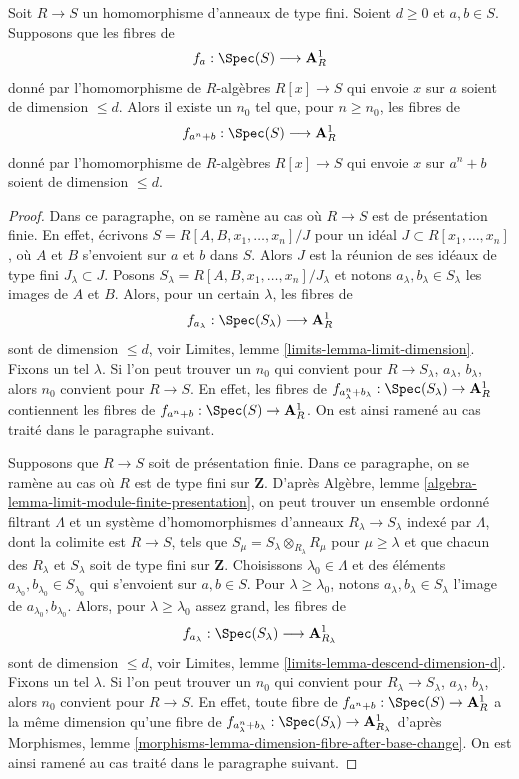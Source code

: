 \begin{lemma}
\label{lemma-sum-is-ok}
Soit $R \to S$ un homomorphisme d'anneaux de type fini. Soient $d \geq 0$ et $a, b \in S$.
Supposons que les fibres de
$$
f_a : \Spec(S) \longrightarrow \mathbf{A}^1_R
$$
donné par l'homomorphisme de $R$-algèbres $R[x] \to S$ qui envoie $x$ sur $a$
soient de dimension $\leq d$. Alors il existe un $n_0$ tel que, pour
$n \geq n_0$, les fibres de
$$
f_{a^n + b} : \Spec(S) \longrightarrow \mathbf{A}^1_R
$$
donné par l'homomorphisme de $R$-algèbres $R[x] \to S$ qui envoie $x$ sur $a^n + b$
soient de dimension $\leq d$.
\end{lemma}

\begin{proof}
Dans ce paragraphe, on se ramène au cas où $R \to S$ est de présentation
finie. En effet, écrivons $S = R[A, B, x_1, \ldots, x_n]/J$ pour un idéal
$J \subset R[x_1, \ldots, x_n]$, où $A$ et $B$ s'envoient sur $a$ et $b$ dans $S$.
Alors $J$ est la réunion de ses idéaux de type fini $J_\lambda \subset J$.
Posons $S_\lambda = R[A, B, x_1, \ldots, x_n]/J_\lambda$ et
notons $a_\lambda, b_\lambda \in S_\lambda$ les images de $A$ et $B$.
Alors, pour un certain $\lambda$, les fibres de
$$
f_{a_\lambda} : \Spec(S_\lambda) \longrightarrow \mathbf{A}^1_R
$$
sont de dimension $\leq d$, voir Limites, lemme \ref{limits-lemma-limit-dimension}.
Fixons un tel $\lambda$. Si l'on peut trouver un $n_0$ qui convient pour $R \to S_\lambda$,
$a_\lambda$, $b_\lambda$, alors $n_0$ convient pour $R \to S$. En effet, les fibres
de $f_{a_\lambda^n + b_\lambda} : \Spec(S_\lambda) \to \mathbf{A}^1_R$
contiennent les fibres de $f_{a^n + b} : \Spec(S) \to \mathbf{A}^1_R$.
On est ainsi ramené au cas traité dans le paragraphe suivant.

\medskip\noindent
Supposons que $R \to S$ soit de présentation finie. Dans ce paragraphe, on se ramène
au cas où $R$ est de type fini sur $\mathbf{Z}$. D'après
Algèbre, lemme \ref{algebra-lemma-limit-module-finite-presentation},
on peut trouver un ensemble ordonné filtrant $\Lambda$ et un système d'homomorphismes d'anneaux
$R_\lambda \to S_\lambda$ indexé par $\Lambda$, dont la colimite est
$R \to S$, tels que $S_\mu = S_\lambda \otimes_{R_\lambda} R_\mu$
pour $\mu \geq \lambda$ et que chacun des $R_\lambda$ et $S_\lambda$
soit de type fini sur $\mathbf{Z}$. Choisissons $\lambda_0 \in \Lambda$ et des
éléments $a_{\lambda_0}, b_{\lambda_0} \in S_{\lambda_0}$ qui s'envoient sur
$a, b \in S$. Pour $\lambda \geq \lambda_0$, notons
$a_\lambda, b_\lambda \in S_\lambda$
l'image de $a_{\lambda_0}, b_{\lambda_0}$.
Alors, pour $\lambda \geq \lambda_0$ assez grand, les fibres de
$$
f_{a_\lambda} : 
\Spec(S_\lambda) \longrightarrow \mathbf{A}^1_{R_\lambda}
$$
sont de dimension $\leq d$, voir
Limites, lemme \ref{limits-lemma-descend-dimension-d}.
Fixons un tel $\lambda$. Si l'on peut trouver un $n_0$ qui convient pour
$R_\lambda \to S_\lambda$, $a_\lambda$, $b_\lambda$, alors $n_0$
convient pour $R \to S$. En effet, toute fibre de
$f_{a^n + b} : \Spec(S) \to \mathbf{A}^1_R$
a la même dimension qu'une fibre de
$f_{a_\lambda^n + b_\lambda} : \Spec(S_\lambda) \to \mathbf{A}^1_{R_\lambda}$
d'après Morphismes, lemme \ref{morphisms-lemma-dimension-fibre-after-base-change}.
On est ainsi ramené au cas traité dans le paragraphe suivant.


\end{proof}
